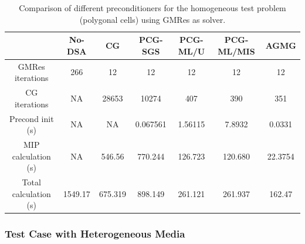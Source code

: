 \documentclass[preprint,10pt]{elsarticle}
\renewcommand{\(}{\left(}
\renewcommand{\)}{\right)}
\renewcommand{\[}{\left[}
\renewcommand{\]}{\right]}
\begin{document}
%
\begin{table}[!htbp]
  \begin{center}
    \caption{Comparison of different preconditioners for the homogeneous test
    problem (polygonal cells) using GMRes as solver.}
    \begin{tabular}{|c|c|c|c|c|c|c|}
      \hline
      & No-DSA & CG & PCG-SGS & PCG-ML/U & PCG-ML/MIS & AGMG \\
      \hline
      GMRes iterations& 266    & 12      & 12      & 12      & 12      & 12 \\
      CG iterations   & NA     & 28653   & 10274   & 407     & 390     & 351\\
\hline
   Precond init (s)   & NA      & NA      & 0.067561& 1.56115 & 7.8932  & 0.0331  \\
MIP calculation (s)   & NA      & 546.56  & 770.244 & 126.723 & 120.680 & 22.3754 \\
Total calculation (s) & 1549.17 & 675.319 & 898.149 & 261.121 & 261.937 & 162.47  \\
      \hline
    \end{tabular}
    \label{comparison_homog_poly_gmres}
  \end{center}
\end{table}

\subsubsection{Test Case with Heterogeneous Media}
\end{document}
